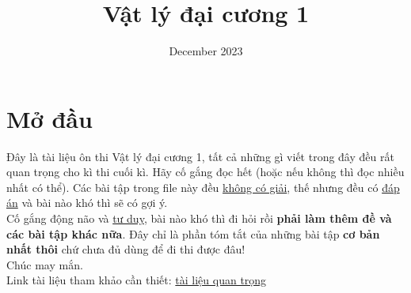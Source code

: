 \documentclass{report}
\title{\textbf{Vật lý đại cương 1}}
\date{December 2023}
\begin{document}
\maketitle
\newpage
\tableofcontents
\listoffigures
\chapter*{Mở đầu}
Đây là tài liệu ôn thi Vật lý đại cương 1, tất cả những gì viết trong đây đều rất quan trọng cho kì thi cuối kì. Hãy cố gắng đọc hết (hoặc nếu không thì đọc nhiều nhất có thể). Các bài tập trong file này đều \underline{không có giải}, thế nhưng đều có \underline{đáp án} và bài nào khó thì sẽ có gợi ý.\\
Cố gắng động não và \underline{tư duy}, bài nào khó thì đi hỏi rồi \textbf{phải làm thêm đề và các bài tập khác nữa}. Đây chỉ là phần tóm tắt của những bài tập \textbf{cơ bản nhất thôi} chứ chưa đủ dùng để đi thi được đâu!\\
Chúc may mắn.
\\
Link tài liệu tham khảo cần thiết: \href{https://l.facebook.com/l.php?u=https%3A%2F%2Fdrive.google.com%2Fdrive%2Ffolders%2F1lDz_WEcGGzRp62-E_ZtqGmv9MXWqfgqY%3Ffbclid%3DIwAR1_8r__ppgSA30LqV4pBOPwkmawpeySmYr7HZnJuZnIRuUsQ6-rjZDTdVU&h=AT2BB4OfY510gKhaVJ7yTtcwPPuFOFjOGf82d_pLjicdrR62W6R2bixtKGZZ79xG7obJBnz3gOL721oXTJfXjMJhGl7i5whIPXHpUVmZy8feHZwx8bo8-WEeBmlRDrGY6U8g0Q}{tài liệu quan trọng}

\newpage



\end{document}
